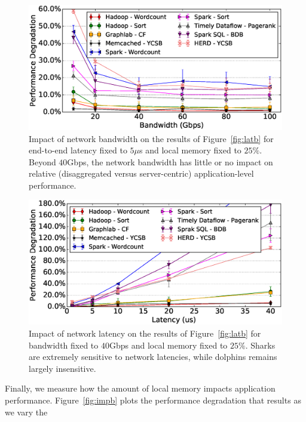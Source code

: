 %
\begin{figure}
  \centering
    \includegraphics[width = \columnwidth]{img/fix_latency_vary_bw.eps} 
  \caption{\small{Impact of network bandwidth on the results of Figure~\ref{fig:latb} for end-to-end latency fixed to $5\mu$s and local memory fixed to $25\%$. Beyond $40$Gbps, the network bandwidth has little or no impact on relative (disaggregated versus server-centric) application-level performance.}}
  \label{fig:impbw}
\end{figure}
%
%
\begin{figure}
  \centering
    \includegraphics[width=\columnwidth]{img/fix_bw_vary_latency.eps} 
  \caption{\small{Impact of network latency on the results of Figure~\ref{fig:latb} for bandwidth fixed to $40$Gbps and local memory fixed to $25\%$. Sharks are extremely sensitive to network latencies, while dolphins remains largely insensitive.}}
  \label{fig:impl}
\end{figure}
%
Finally, we measure how the amount of local memory impacts application performance.
Figure~\ref{fig:impb} plots the performance degradation that results as we vary the 
